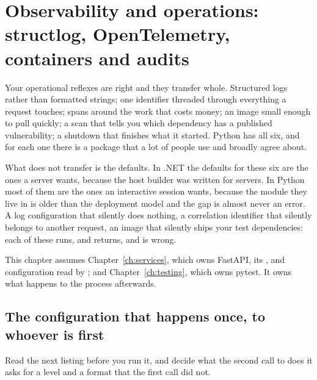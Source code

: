 
\chapter{Observability and operations: structlog, OpenTelemetry, containers and audits}
\label{ch:observability}

\noindent
Your operational reflexes are right and they transfer whole. Structured
logs rather than formatted strings; one identifier threaded through
everything a request touches; spans around the work that costs money; an
image small enough to pull quickly; a scan that tells you which dependency
has a published vulnerability; a shutdown that finishes what it started.
Python has all six, and for each one there is a package that a lot of
people use and broadly agree about.

What does not transfer is the defaults. In .NET the defaults for these six
are the ones a server wants, because the host builder was written for
servers. In Python most of them are the ones an interactive session wants,
because the module they live in is older than the deployment model \dash{}
and the gap is almost never an error. A log configuration that silently
does nothing, a correlation identifier that silently belongs to another
request, an image that silently ships your test dependencies: each of
these runs, and returns, and is wrong.

This chapter assumes Chapter~\ref{ch:services}, which owns FastAPI, its
, and configuration read by ; and
Chapter~\ref{ch:testing}, which owns pytest. It owns what happens to the
process afterwards.

\section{The configuration that happens once, to whoever is first}
\label{sec:ch12-logging}

Read the next listing before you run it, and decide what the second call
to  does \dash{} it asks for a level and a format that
the first call did not.


